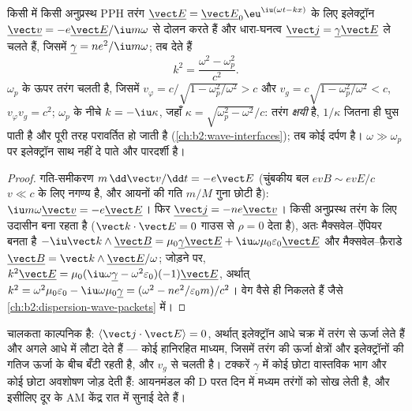 \begin{theorem}[प्लाज़्मा का परिक्षेपण-संबंध]\label{thm:b2:waves-in-media:plasmadispersion}
किसी  में किसी अनुप्रस्थ PPH तरंग $\underline{\vect E} = \underline{\vect E}_0\eu^{\iu(\omega t - kx)}$ के
लिए इलेक्ट्रॉन $\underline{\vect v} = -e\underline{\vect E}/\iu m\omega$ से दोलन करते हैं
और धारा-घनत्व $\underline{\vect j} = \underline\gamma\underline{\vect E}$ ले चलते हैं, जिसमें
$\underline\gamma = ne^2/\iu m\omega$; तब  देते हैं
\[
k^2 = \frac{\omega^2 - \omega_p^2}{c^2} .
\]
$\omega_p$ के ऊपर तरंग चलती है, जिसमें $v_\varphi = c/\sqrt{1 - \omega_p^2/\omega^2}
> c$ और $v_g = c\sqrt{1 - \omega_p^2/\omega^2} < c$, $v_\varphi v_g = c^2$; $\omega_p$ के
नीचे $k = -\iu\kappa$, जहाँ $\kappa = \sqrt{\omega_p^2 - \omega^2}/c$: तरंग
\emph{क्षयी} है, $1/\kappa$ जितना ही घुस पाती है और पूरी तरह परावर्तित हो जाती है
(\cref{ch:b2:wave-interfaces}); तब  कोई दर्पण है। $\omega
\gg \omega_p$ पर इलेक्ट्रॉन साथ नहीं दे पाते और  पारदर्शी है।
\end{theorem}

\begin{proof}
गति-समीकरण $m\,\dd\vect v/\dd t = -e\vect E$ (चुंबकीय बल
$ev B \sim evE/c$ $v \ll c$ के लिए नगण्य है, और आयनों की गति
$m/M$ गुना छोटी है): $\iu m\omega\underline{\vect v} = -e\underline{\vect E}$। फिर
$\underline{\vect j} = -ne\underline{\vect v}$। किसी अनुप्रस्थ तरंग के लिए  उदासीन बना रहता
है ($\vect k\cdot\vect E = 0$ गाउस से $\rho = 0$ देता है), अतः
मैक्सवेल--ऐंपियर बनता है $-\iu\vect k\wedge\underline{\vect B} = \mu_0\underline\gamma\underline{\vect E}
+ \iu\omega\mu_0\varepsilon_0\underline{\vect E}$ और मैक्सवेल--फ़ैराडे $\underline{\vect B} = \vect k
\wedge\underline{\vect E}/\omega$; जोड़ने पर, $k^2\underline{\vect E} = \mu_0(\iu\omega\underline\gamma -
\omega^2\varepsilon_0)(-1)\underline{\vect E}$, अर्थात् $k^2 = \omega^2\mu_0\varepsilon_0 - \iu\omega\mu_0
\underline\gamma = (\omega^2 - ne^2/\varepsilon_0m)/c^2$। वेग वैसे ही निकलते हैं जैसे
\cref{ch:b2:dispersion-wave-packets} में।
\end{proof}

\begin{remark}[ऊर्जा कहाँ जाती है]\label{rem:b2:waves-in-media:plasmaenergy}
चालकता काल्पनिक है: $\langle\vect j\cdot\vect E\rangle = 0$, अर्थात् इलेक्ट्रॉन
आधे चक्र में तरंग से ऊर्जा लेते हैं और अगले आधे में लौटा देते हैं --- कोई
हानिरहित माध्यम, जिसमें तरंग की ऊर्जा क्षेत्रों और इलेक्ट्रॉनों की गतिज
ऊर्जा के बीच बँटी रहती है, और $v_g$ से चलती है। टक्करें $\underline\gamma$ में कोई
छोटा वास्तविक भाग और कोई छोटा अवशोषण जोड़ देती हैं: आयनमंडल की D परत
दिन में मध्यम तरंगों को सोख लेती है, और इसीलिए दूर के AM केंद्र रात में
सुनाई देते हैं।
\end{remark}

